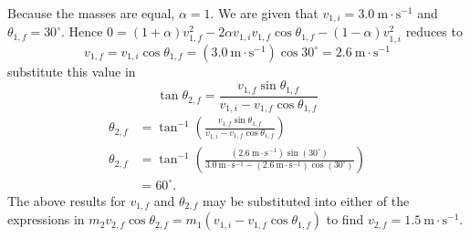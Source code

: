 \begin{answer}
 Because the masses are equal, $\alpha=1$. We are given that $v_{1, i}=3.0 \mathrm{~m} \cdot \mathrm{s}^{-1}$ and $\theta_{1, f}=30^{\circ}$. Hence  $0=(1+\alpha) v_{1, f}^{2}-2 \alpha v_{1, i} v_{1, f} \cos \theta_{1, f}-(1-\alpha) v_{1, i}^{2}$ reduces  to
$$ v_{1, f}=v_{1, i} \cos \theta_{1, f}=\left(3.0 \mathrm{~m} \cdot \mathrm{s}^{-1}\right) \cos 30^{\circ}=2.6 \mathrm{~m} \cdot \mathrm{s}^{-1} $$
substitute this value in 
$$\tan \theta_{2, f}=\frac{v_{1, f} \sin \theta_{1, f}}{v_{1, i}-v_{1, f} \cos \theta_{1, f}}$$
$$\begin{aligned}
	\theta_{2, f} &=\tan ^{-1}\left(\frac{v_{1, f} \sin \theta_{1, f}}{v_{1, i}-v_{1, f} \cos \theta_{1, f}}\right) \\
	\theta_{2, f} &=\tan ^{-1}\left(\frac{\left(2.6 \mathrm{~m} \cdot \mathrm{s}^{-1}\right) \sin \left(30^{\circ}\right)}{3.0 \mathrm{~m} \cdot \mathrm{s}^{-1}-\left(2.6 \mathrm{~m} \cdot \mathrm{s}^{-1}\right) \cos \left(30^{\circ}\right)}\right) \\
	&=60^{\circ} .
\end{aligned}$$	
The above results for $v_{1, f}$ and $\theta_{2, f}$ may be substituted into either of the expressions in $m_{2} v_{2, f} \cos \theta_{2, f}=m_{1}\left(v_{1, i}-v_{1, f} \cos \theta_{1, f}\right)$  to find $v_{2, f}=1.5 \mathrm{~m} \cdot \mathrm{s}^{-1}$. 
\end{answer}
